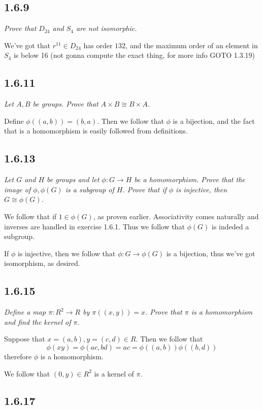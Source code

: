 \documentclass[11pt,oneside,titlepage]{book}
\begin{document}
\subsection*{1.6.9}

\textit{Prove that $D_{24}$ and $S_4$ are not isomorphic.}

We've got that $r^{11} \in D_{24}$ has order $132$, and the maximum order of an element in $S_4$
is below 16 (not gonna compute the exact thing, for more info GOTO 1.3.19)

\subsection*{1.6.11}

\textit{Let $A, B$ be groups. Prove that $A \times B \cong B \times A$.}

Define $\phi((a, b)) = (b, a)$. Then we follow that $\phi$ is a bijection, and
the fact that is a homomorphism is easily followed from definitions.

\subsection*{1.6.13}

\textit{Let $G$ and $H$ be groups and let $\phi: G \to H$ be a homomorphism. Prove that
  the image of $\phi, \phi(G)$ is a subgroup of $H$. Prove that if $\phi$ is injective,
  then $G \cong \phi(G)$.}

We follow that if $1 \in \phi(G)$, as proven earlier. Associativity comes naturally and
inverses are handled in exercise 1.6.1. Thus we follow that $\phi(G)$ is indeded a subgroup.

If $\phi$ is injective, then we follow that $\phi: G \to \phi(G)$ is a bijection,
thus we've got isomorphism, as desired.

\subsection*{1.6.15}

\textit{Define a map $\pi: R^2 \to R$ by $\pi((x, y)) = x$. Prove that $\pi$ is a homomorphism
  and find the kernel of $\pi$.}

Suppose that $x = (a, b), y = (c, d) \in R$. Then we follow that
$$\phi(xy) = \phi(ac, bd) = ac = \phi((a, b)) \phi((b, d))$$
therefore $\phi$ is a homomorphism.

We follow that $(0, y)\in R^2$ is a kernel of $\pi$.

\subsection*{1.6.17}
\end{document}
